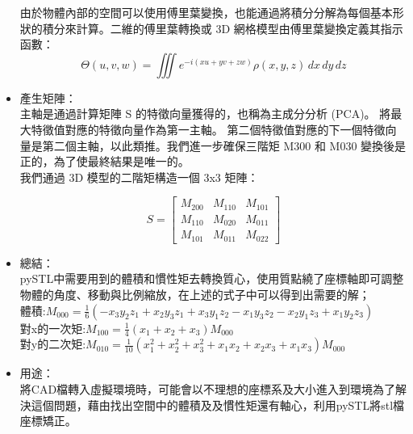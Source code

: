 \begin{itemize}
由於物體內部的空間可以使用傅里葉變換，也能通過將積分分解為每個基本形狀的積分來計算。二維的傅里葉轉換或 3D 網格模型由傅里葉變換定義其指示函數：\\

$$ \Theta (u,v,w) = \iiint e^{-i (xu+yv+zw)} \rho (x,y,z) \,dx\,dy\,dz $$

\item 產生矩陣：\\
主軸是通過計算矩陣 S 的特徵向量獲得的，也稱為主成分分析 (PCA)。 將最大特徵值對應的特徵向量作為第一主軸。 第二個特徵值對應的下一個特徵向量是第二個主軸，以此類推。我們進一步確保三階矩 M300 和 M030 變換後是正的，為了使最終結果是唯一的。\\

我們通過 3D 模型的二階矩構造一個 3x3 矩陣：

\[ 
S=\begin{bmatrix} 
M_{200} & M_{110} & M_{101} \\
M_{110} & M_{020} & M_{011} \\
M_{101} & M_{011} & M_{022} 
\end{bmatrix}
\]


\item 總結：\\
pySTL中需要用到的體積和慣性矩去轉換質心，使用質點繞了座標軸即可調整物體的角度、移動與比例縮放，在上述的式子中可以得到出需要的解；\\

體積:$M_{000} = \frac{1}{6}(-x_3 y_2 z_1 + x_2 y_3 z_1 + x_3 y_1 z_2 - x_1 y_3 z_2 - x_2 y_1 z_3 + x_1 y_2 z_3) $\\

對x的一次矩:$M_{100} = \frac{1}{4}(x_1 + x_2 + x_3) M_{000} $\\

對y的二次矩:$M_{010} = \frac{1}{10}(x_1^{2} + x_2^{2} + x_3^{2} + x_1 x_2 + x_2 x_3 + x_1 x_3 ) M_{000} $\\







\item 用途：\\
將CAD檔轉入虛擬環境時，可能會以不理想的座標系及大小進入到環境為了解決這個問題，藉由找出空間中的體積及及慣性矩還有軸心，利用pySTL將stl檔座標矯正。\\

\end{itemize}